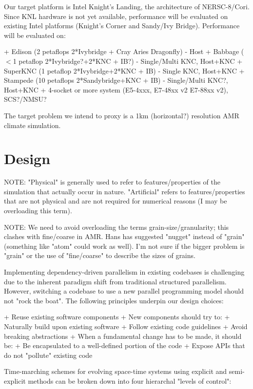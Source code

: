 \documentclass[final,letterpaper,10pt]{article}
\begin{document}
Our target platform is Intel Knight's Landing, the architecture of NERSC-8/Cori.
Since KNL hardware is not yet available, performance will be evaluated on
existing Intel platforms (Knight's Corner and Sandy/Ivy Bridge). Performance will
be evaluated on:

+ Edison (2 petaflops 2*Ivybridge + Cray Aries Dragonfly) - Host
+ Babbage ($<$1 petaflop 2*Ivybridge?+2*KNC + IB?) - Single/Multi KNC, Host+KNC
+ SuperKNC (1 petaflop 2*Ivybridge+2*KNC + IB) - Single KNC, Host+KNC
+ Stampede (10 petaflops 2*Sandybridge+KNC + IB) - Single/Multi KNC?, Host+KNC
+ 4-socket or more system (E5-4xxx, E7-48xx v2 E7-88xx v2), SCS?/NMSU?

The target problem we intend to proxy is a 1km (horizontal?) resolution AMR climate simulation.

\section{Design}

NOTE: "Physical" is generally used to refer to features/properties of the
simulation that actually occur in nature. "Artificial" refers to
features/properties that are not physical and are not required for numerical
reasons (I may be overloading this term). 

NOTE: We need to avoid overloading the terms grain-size/granularity; this clashes
with fine/coarse in AMR. Hans has suggested "nugget" instead of "grain" (something
like "atom" could work as well). I'm not sure if the bigger problem is "grain" or
the use of "fine/coarse" to describe the sizes of grains.

Implementing dependency-driven parallelism in existing codebases is challenging due
to the inherent paradigm shift from traditional structured parallelism. However,
switching a codebase to use a new parallel programming model should not "rock the boat".
The following principles underpin our design choices:

+ Reuse existing software components
+ New components should try to:
    + Naturally build upon existing software 
    + Follow existing code guidelines
    + Avoid breaking abstractions
+ When a fundamental change has to be made, it should be:
    + Be encapsulated to a well-defined portion of the code 
    + Expose APIs that do not "pollute" existing code

Time-marching schemes for evolving space-time systems using explicit and
semi-explicit methods can be broken down into four hierarchal "levels of control":
\end{document}
